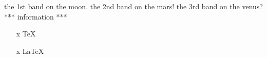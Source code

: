 \documentclass{article}
\begin{document}
the 1st band on the moon.
\newpage
the 2nd band on the mars!
\newpage
the 3rd band on the venus?
\color{red}
*** information ***
\color{black}
\begin{itemize}
\item[x] \TeX
\item[x] \LaTeX
\end{itemize}
\end{document}
